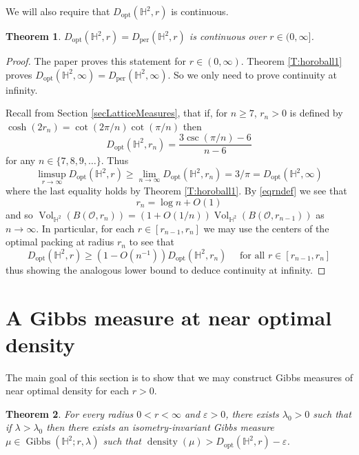 \documentclass[11pt]{amsart}
\newtheorem{theorem}{Theorem}
\theoremstyle{definition}
\theoremstyle{remark}
\renewcommand{\H}{\mathbb{H}}
\newcommand{\density}{\operatorname{density}}
\newcommand{\opt}{\operatorname{opt}}
\newcommand{\per}{\operatorname{per}}
\newcommand{\Dopt}{D_{\opt}}
\newcommand{\Vol}{\operatorname{Vol}}
\newcommand{\lam}{\lambda}
\newcommand{\eps}{\varepsilon}
\renewcommand{\epsilon}{\eps}
\newcommand{\Gibbs}{\operatorname{Gibbs}}
\begin{document}
We will also require that $\Dopt(\H^2,r)$ is continuous.

\begin{theorem}\label{T:continuity2}
    $D_{\opt}(\H^2,r)=D_{\per}(\H^2,r)$ is continuous over $r\in (0,\infty]$. 
\end{theorem}

\begin{proof}
    The paper \cite{bowen2003periodic} proves this statement for $r \in (0,\infty)$. Theorem  \ref{T:horoball1} proves $D_{\opt}(\H^2,\infty)=D_{\per}(\H^2,\infty)$. So we only need to prove continuity at infinity. 

       Recall from Section \ref{secLatticeMeasures}, that if, for $n\ge 7$, $r_n>0$ is defined by $\cosh(2r_n) = \cot(2\pi/n)\cot(\pi/n)$ then 
    $$D_{\opt}(\H^2,r_n) = \frac{3\csc(\pi/n)-6}{n-6}$$
for any $n \in \{7,8,9,\ldots\}$. Thus 
    $$\limsup_{r\to\infty} D_{\opt}(\H^2,r)\ge \lim_{n \to \infty} \Dopt(\H^2,r_n) = 3/\pi =  D_{\opt}(\H^2,\infty) $$
where the last equality holds by Theorem \ref{T:horoball1}.  By \eqref{eqrndef} we see that \begin{equation*}
    r_n = \log n + O(1)
\end{equation*}
and so $\Vol_{\H^2}(B(\mathcal{O},r_n)) = (1 + O(1/n)) \Vol_{\H^2}(B(\mathcal{O},r_{n-1}))$ as $n \to \infty$.  In particular, for each $r \in [r_{n-1},r_n]$ we may use the centers of the optimal packing at radius $r_{n}$ to see that \begin{equation*}
    \Dopt(\H^2,r) \geq \left(1 - O(n^{-1}) \right) \Dopt(\H^2,r_n) \quad \text{ for all }r \in [r_{n-1},r_n]
\end{equation*}
 thus showing the analogous lower bound to deduce continuity at infinity.
\end{proof}





\section{A Gibbs measure at near optimal density}
\label{secDenseGibbs}

The main goal of this section is to show that we may construct Gibbs measures of near optimal density for each $r > 0$.  

\begin{theorem}\label{T:near-optimal}
For every radius $0<r<\infty$ and $\epsilon>0$, there exists $\lam_0>0$ such that if $\lam> \lam_0$ then there exists an isometry-invariant Gibbs measure $\mu \in \Gibbs(\H^2;r,\lambda)$ such that $\density(\mu)>\Dopt(\H^2,r)-\epsilon$.
\end{theorem}
\end{document}
